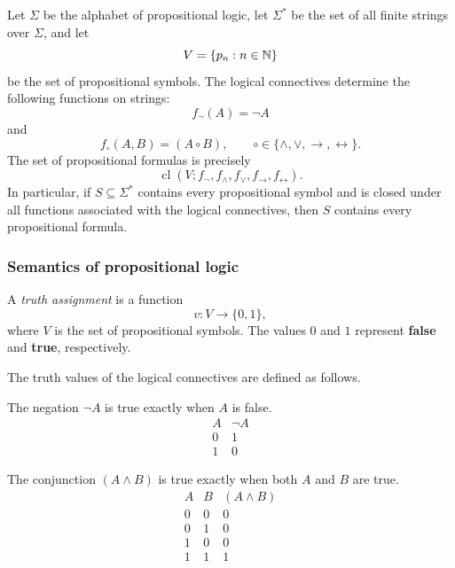 \documentclass[11pt,a4paper]{amsart}
\begin{document}
Let \(\Sigma\) be the alphabet of propositional logic, let \(\Sigma^*\) be the
set of all finite strings over \(\Sigma\), and let
\[
  V=\{p_n:n\in\mathbb{N}\}
\]
be the set of propositional symbols. The logical connectives determine the
following functions on strings:
\[
  f_{\neg}(A)=\neg A
\]
and
\[
  f_{\circ}(A,B)=(A \mathbin{\circ} B),
  \qquad
  \circ\in\{\land,\lor,\rightarrow,\leftrightarrow\}.
\]
The set of propositional formulas is precisely
\[
  \operatorname{cl}
  (V;f_{\neg},f_{\land},f_{\lor},f_{\rightarrow},f_{\leftrightarrow}).
\]
In particular, if \(S \subseteq \Sigma^*\) contains every propositional symbol
and is closed under all functions associated with the logical connectives,
then \(S\) contains every propositional formula.

\subsubsection{Semantics of propositional logic}

\begin{definition}
  A \emph{truth assignment} is a function
  \[
    v\colon V\longrightarrow\{0,1\},
  \]
  where \(V\) is the set of propositional symbols. The values \(0\) and \(1\)
  represent \textbf{false} and \textbf{true}, respectively.
\end{definition}

The truth values of the logical connectives are defined as follows.

\begin{definition}[Negation]
  The negation \(\neg A\) is true exactly when \(A\) is false.
  \[
    \begin{array}{c|c}
      A & \neg A \\
      \hline
      0 & 1 \\
      1 & 0
    \end{array}
  \]
\end{definition}

\begin{definition}[Conjunction]
  The conjunction \((A\land B)\) is true exactly when both \(A\) and \(B\) are
  true.
  \[
    \begin{array}{cc|c}
      A & B & (A\land B) \\
      \hline
      0 & 0 & 0 \\
      0 & 1 & 0 \\
      1 & 0 & 0 \\
      1 & 1 & 1
    \end{array}
  \]
\end{definition}
\end{document}
